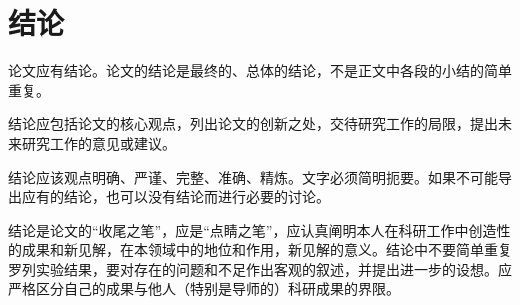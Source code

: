 \chapter{结\hspace{1em}论}

论文应有结论。论文的结论是最终的、总体的结论，不是正文中各段的小结的简单重复。

结论应包括论文的核心观点，列出论文的创新之处，交待研究工作的局限，提出未来研究工作的意见或建议。

结论应该观点明确、严谨、完整、准确、精炼。文字必须简明扼要。如果不可能导出应有的结论，也可以没有结论而进行必要的讨论。

结论是论文的“收尾之笔”，应是“点睛之笔”，应认真阐明本人在科研工作中创造性的成果和新见解，在本领域中的地位和作用，新见解的意义。结论中不要简单重复罗列实验结果，要对存在的问题和不足作出客观的叙述，并提出进一步的设想。应严格区分自己的成果与他人（特别是导师的）科研成果的界限。